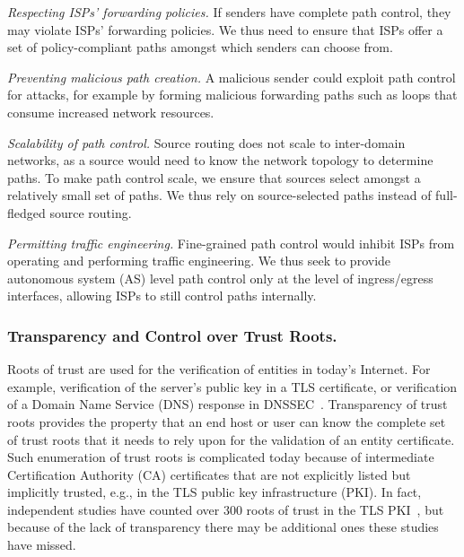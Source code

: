 \documentclass[a4paper]{llncs}
\begin{document}
\begin{compactitem}

  \item \emph{Respecting ISPs' forwarding policies.} If senders have complete
      path control, they may violate ISPs' forwarding policies.  We thus need
      to ensure that ISPs offer a set of policy-compliant paths amongst which
      senders can choose from.

  \item \emph{Preventing malicious path creation.} A malicious sender could
      exploit path control for attacks, for example by forming malicious
      forwarding paths such as loops that consume increased network resources.

  \item \emph{Scalability of path control.} Source routing does not scale to
      inter-domain networks, as a source would need to know the network
      topology to determine paths. To make path control scale, we ensure that
      sources select amongst a relatively small set of paths.  We thus rely on
      source-selected paths instead of full-fledged source routing.

  \item \emph{Permitting traffic engineering.} Fine-grained path control would
      inhibit ISPs from operating and performing traffic engineering. We thus
      seek to provide autonomous system (AS) level path control only at the
      level of ingress/egress interfaces, allowing ISPs to still control paths
      internally.

              \end{compactitem}


\smallskip
\subsubsection{Transparency and Control over Trust Roots.}
Roots of trust are used for the
verification of entities in today's Internet. For example, verification of the
server's public key in a TLS certificate, 
or verification of a Domain Name Service (DNS) response in DNSSEC~\cite{rfc4033}.
Transparency of trust roots provides the property that an end host or user can
know the complete set of trust roots that it needs to rely upon for the
validation of an entity certificate. Such enumeration of trust roots is
complicated today because of intermediate Certification Authority (CA)
certificates that are not explicitly listed but implicitly trusted, e.g., in
the TLS public key infrastructure (PKI). In fact, independent studies have
counted over 300 roots of trust in the TLS
PKI~\cite{SSL-observatory,AbBiMiWoXi2013}, but because of the lack of
transparency there may be additional ones these studies have missed.
\end{document}
